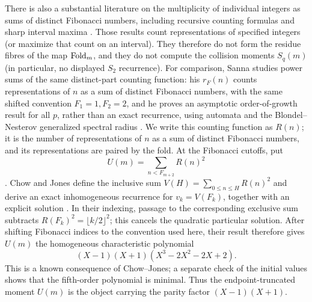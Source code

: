 There is also a substantial literature on the multiplicity of individual
integers as sums of distinct Fibonacci numbers, including recursive counting
formulas \cite{BicknellJohnsonFielder1999} and sharp interval maxima
\cite{KocabovaMasakovaPelantova2005}.  Those results count representations of
specified integers (or maximize that count on an interval).  They therefore do
not form the residue fibres of the map $\operatorname{Fold}_m$, and they do not compute the
collision moments $S_q(m)$ (in particular, no displayed $S_2$ recurrence).
For comparison, Sanna studies power sums of the same distinct-part counting
function: his $r_F(n)$ counts representations of $n$ as a sum of distinct
Fibonacci numbers, with the same shifted convention $F_1=1,F_2=2$, and he
proves an asymptotic order-of-growth result for all $p$, rather than an exact
recurrence, using automata and the Blondel--Nesterov generalized spectral
radius \cite{Sanna2025FibonacciPowerSums}.  We write this counting function as
$R(n)$; it is the number of representations of $n$ as a sum of distinct
Fibonacci numbers, and its representations are paired by the fold.  At the
Fibonacci cutoffs, put
\[
 U(m)=\sum_{n<F_{m+2}}R(n)^2
\].
Chow and Jones define the inclusive sum
$V(H)=\sum_{0\le n\le H}R(n)^2$ and derive an exact inhomogeneous
recurrence for $v_k=V(F_k)$, together with an explicit solution
\cite{ChowJones2024Variance}.  In their indexing, passage to the corresponding
exclusive sum subtracts
$R(F_k)^2=\lfloor k/2\rfloor^2$; this cancels the quadratic particular
solution.  After shifting Fibonacci indices to the convention used here, their
result therefore gives $U(m)$ the homogeneous characteristic polynomial
\[
 (X-1)(X+1)(X^3-2X^2-2X+2).
\]
This is a known consequence of Chow--Jones; a separate check of the initial
values shows that the fifth-order polynomial is minimal.  Thus the
endpoint-truncated moment \(U(m)\) is the object carrying the parity factor
\((X-1)(X+1)\).


